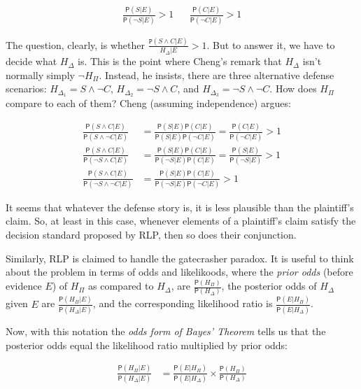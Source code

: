 \documentclass[10pt,dvipsnames,enabledeprecatedfontcommands]{scrartcl}
\newcommand{\n}{\neg}
\newcommand{\et}{\wedge}
\newcommand{\pr}[1]{\mathsf{P}(#1)}
\begin{document}
\begin{align}
 \nonumber 
 \frac{\pr{S\vert E}}{\pr{\n S \vert E}} > 1   & & \frac{\pr{C\vert E}}{\pr{\n C \vert E}} > 1
\end{align}

\noindent The question, clearly, is whether
\(\frac{\mathtt{P}(S\et C\vert E)}{H_\Delta \vert E}>1\). But to answer
it, we have to decide what \(H_\Delta\) is. This is the point where
Cheng's remark that \(H_\Delta\) isn't normally simply \(\n H_\Pi\).
Instead, he insists, there are three alternative defense scenarios:
\(H_{\Delta_1}= S\et \n C\), \(H_{\Delta_2}=\n S \et C\), and
\(H_{\Delta_3}=\n S \et \n C\). How does \(H_\Pi\) compare to each of
them? Cheng (assuming independence) argues:

\begin{align}\label{eq:cheng-multiplication}
\frac{\pr{S\et C\vert E}}{\pr{S\et \n C\vert E}} & = \frac{\pr{S\vert E}\pr{C\vert E}}{\pr{S \vert E}\pr{\n C \vert E}}  =\frac{\pr{C\vert E}}{\pr{\n C \vert E}} > 1 \\
\nonumber
\frac{\pr{S\et C\vert E}}{\pr{\n S\et C\vert E}} & = \frac{\pr{S\vert E}\pr{C\vert E}}{\pr{\n S \vert E}\pr{C\vert E}}  = \frac{\pr{S\vert E}}{\pr{\n S \vert E}} > 1 \\
\nonumber
\frac{\pr{S\et C\vert E}}{\pr{\n S\et \n C\vert E}} & = \frac{\pr{S\vert E}\pr{C\vert E}}{\pr{\n S \vert E}\pr{\n C \vert E}}   > 1 
\end{align}

\noindent It seems that whatever the defense story is, it is less
plausible than the plaintiff's claim. So, at least in this case,
whenever elements of a plaintiff's claim satisfy the decision standard
proposed by RLP, then so does their conjunction.

Similarly, RLP is claimed to handle the gatecrasher paradox. It is
useful to think about the problem in terms of odds and likelikoods,
where the \emph{prior odds} (before evidence \(E\)) of \(H_\Pi\) as
compared to \(H_\Delta\), are \(\frac{\pr{H_\Pi}}{\pr{H_\Delta}}\), the
posterior odds of \(H_\Delta\) given \(E\) are
\(\frac{\pr{H_\Pi \vert E}}{\pr{H_\Delta \vert E}}\), and the
corresponding likelihood ratio is
\(\frac{\pr{E\vert H_\Pi}}{\pr{E\vert H_\Delta}}\).

Now, with this notation the \emph{odds form of Bayes' Theorem} tells us
that the posterior odds equal the likelihood ratio multiplied by prior
odds:

\begin{align*}
\frac{\pr{H_\Pi \vert E}}{\pr{H_\Delta \vert E}} & = 
\frac{\pr{E\vert H_\Pi}}{\pr{E\vert H_\Delta}} 
\times \frac{\pr{H_\Pi}}{\pr{H_\Delta}}
 \end{align*}
\end{document}
